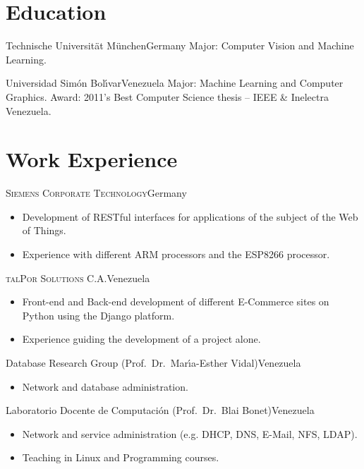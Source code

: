 \documentclass[10pt]{moderncv}
\begin{document}
\maketitle

\section{Education}

  {Technische Universit\"at M\"unchen}{Germany}{}{%
    Major: Computer Vision and Machine Learning.
  }

  {Universidad Sim\'on Bol\'{\i}var}{Venezuela}{}{%
    Major: Machine Learning and Computer Graphics.
    \newline
    Award: 2011's Best Computer Science thesis -- IEEE \& Inelectra Venezuela.
  }

\section{Work Experience}

{\textsc{Siemens Corporate Technology}}{Germany}{}{%
\begin{itemize}
  \item Development of RESTful interfaces for applications of the 
    subject of the Web of Things.
  \item Experience with different ARM processors and the ESP8266 processor.
\end{itemize}
}

{\textsc{talPor Solutions C.A.}}{Venezuela}{}{%
\begin{itemize}
  \item Front-end and Back-end development of different E-Commerce sites
    on Python using the Django platform.
  \item Experience guiding the development of a project alone.
\end{itemize}
}

{Database Research Group (Prof.\ Dr.\ Mar\'{\i}a-Esther Vidal)}{Venezuela}{}{%
\begin{itemize}
  \item Network and database administration.
\end{itemize}
}

{Laboratorio Docente de Computaci\'{o}n (Prof.\ Dr.\ Blai Bonet)}{Venezuela}{}{%
\begin{itemize}
  \item Network and service administration (e.g. DHCP, DNS, E-Mail, NFS, LDAP).
  \item Teaching in Linux and Programming courses.
\end{itemize}
}
\end{document}
